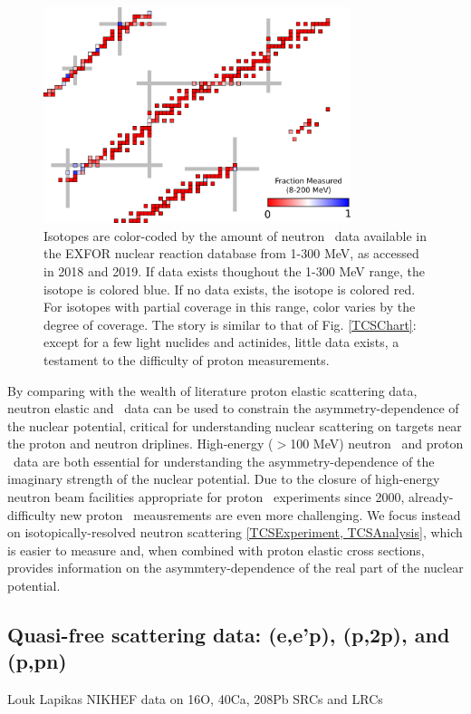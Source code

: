 \begin{figure}
    \includegraphics[width=0.8\textwidth]{figures/RCSChart.png}
    \caption[Landscape of existing proton \rxn\ data in 2019]
    {Isotopes are color-coded by the amount of neutron \tot\ data available in the EXFOR nuclear
        reaction database from 1-300 MeV, as accessed in 2018 and 2019. If data exists thoughout the 1-300 MeV range, the isotope
        is colored blue. If no data exists, the isotope is colored red. For
        isotopes with partial coverage in this range, color varies by the degree
        of coverage. The story is similar to that
        of Fig. \ref{TCSChart}: except for a few light nuclides and actinides, little data exists, a
    testament to the difficulty of proton \rxn measurements.}
    \label{RCSChart}
\end{figure}

By comparing with the wealth of literature proton elastic scattering data, neutron elastic and \tot\ data
can be used to constrain the asymmetry-dependence of the nuclear potential, critical for
understanding nuclear scattering on targets near the proton and neutron
driplines. High-energy ($>$100 MeV) neutron \tot\ and proton \rxn\ data are both essential for
understanding the asymmetry-dependence of the imaginary strength of the nuclear
potential. Due to the closure of high-energy neutron beam facilities appropriate
for proton \rxn\ experiments since 2000, already-difficulty new proton \rxn\
meausrements are even more challenging. We focus instead on 
isotopically-resolved neutron scattering \ref{TCSExperiment, TCSAnalysis}, which
is easier to measure and, when combined with proton elastic cross sections, provides information on the
asymmtery-dependence of the real part of the nuclear potential. 

\subsection{Quasi-free scattering data: (e,e'p), (p,2p), and (p,pn)}
Louk Lapikas
NIKHEF data on 16O, 40Ca, 208Pb
SRCs and LRCs

